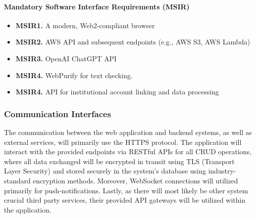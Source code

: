 \paragraph{Mandatory Software Interface Requirements (MSIR)}
\begin{itemize}
    \item \textbf{MSIR1.} A modern, Web2-compliant browser
    \item \textbf{MSIR2.} AWS API and subsequent endpoints (e.g., AWS S3, AWS Lambda)
    \item \textbf{MSIR3.} OpenAI ChatGPT API
    \item \textbf{MSIR4.} WebPurify for text checking.
    \item \textbf{MSIR4.} API for institutional account linking and data processing

\end{itemize}




\subsubsection{Communication Interfaces}
The communication between the web application and backend systems, as well as external services, will primarily use the HTTPS protocol. The application will interact with the provided endpoints via RESTful APIs for all CRUD operations, where all data exchanged will be encrypted in transit using TLS (Transport Layer Security) and stored securely in the system's database using industry-standard encryption methods. Moreover, WebSocket connections will utilized primarily for push-notifications. Lastly, as there will most likely be other system crucial third party services, their provided API gateways will be utilized within the application.
